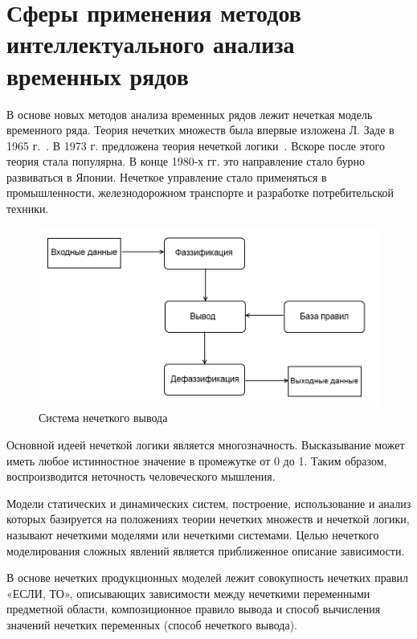 \section{Сферы применения методов интеллектуального анализа временных рядов}

В основе новых методов анализа временных рядов лежит нечеткая модель временного ряда. 
Теория нечетких множеств была впервые изложена Л. Заде в 1965 г.~\cite{zadeh1965fuzzy}. 
В 1973 г. предложена теория нечеткой логики~\cite{Zadeh1973}. 
Вскоре после этого теория стала популярна. 
В конце 1980-х гг. это направление стало бурно развиваться в Японии. 
Нечеткое управление стало применяться в промышленности, железнодорожном транспорте и разработке потребительской техники.

\begin{figure}[h]
    \includegraphics{images/fuzzy_engine.png}
    \caption{Система нечеткого вывода}
    \label{figure:fuzzy_engine}
\end{figure}

Основной идеей нечеткой логики является многозначность. 
Высказывание может иметь любое истинностное значение в промежутке от 0 до 1. 
Таким образом, воспроизводится неточность человеческого мышления.

Модели статических и динамических систем, построение, 
использование и анализ которых базируется на положениях теории нечетких множеств и нечеткой логики, называют нечеткими моделями или нечеткими системами. 
Целью нечеткого моделирования сложных явлений является приближенное описание зависимости. 

В основе нечетких продукционных моделей лежит совокупность нечетких правил «ЕСЛИ, ТО», 
описывающих зависимости между нечеткими переменными предметной области, 
композиционное правило вывода и способ вычисления значений нечетких переменных (способ нечеткого вывода).

